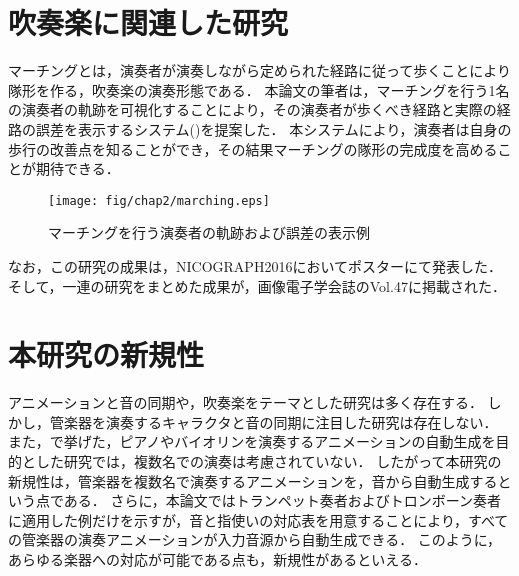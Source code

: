 \section{吹奏楽に関連した研究} \label{sec:marching}
マーチングとは，演奏者が演奏しながら定められた経路に従って歩くことにより隊形を作る，吹奏楽の演奏形態である．
本論文の筆者は，マーチングを行う1名の演奏者の軌跡を可視化することにより，その演奏者が歩くべき経路と実際の経路の誤差を表示するシステム()\cite{nicograph}\cite{iieej}を提案した．
本システムにより，演奏者は自身の歩行の改善点を知ることができ，その結果マーチングの隊形の完成度を高めることが期待できる．
\begin{figure}[H]
	\centering
	\texttt{[image: fig/chap2/marching.eps]}
	\caption{マーチングを行う演奏者の軌跡および誤差の表示例}
	\label{fig:marching}
\end{figure}
なお，この研究の成果は，NICOGRAPH2016においてポスター\cite{nicograph}にて発表した．
そして，一連の研究をまとめた成果が，画像電子学会誌のVol.47\cite{iieej}に掲載された．

\section{本研究の新規性}\label{sec:compere}
アニメーションと音の同期や，吹奏楽をテーマとした研究は多く存在する．
しかし，管楽器を演奏するキャラクタと音の同期に注目した研究は存在しない．
また，で挙げた，ピアノやバイオリンを演奏するアニメーションの自動生成を目的とした研究では，複数名での演奏は考慮されていない．
したがって本研究の新規性は，管楽器を複数名で演奏するアニメーションを，音から自動生成するという点である．
さらに，本論文ではトランペット奏者およびトロンボーン奏者に適用した例だけを示すが，音と指使いの対応表を用意することにより，すべての管楽器の演奏アニメーションが入力音源から自動生成できる．
このように，あらゆる楽器への対応が可能である点も，新規性があるといえる．